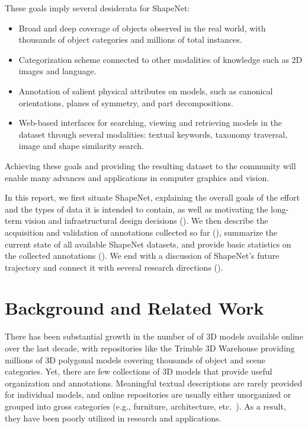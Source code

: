 These goals imply several desiderata for ShapeNet:
\begin{itemize}\denselist
 \item Broad and deep coverage of objects observed in the real world, with thousands of object categories and millions of total instances.
 \item Categorization scheme connected to other modalities of knowledge such as 2D images and language.
 \item Annotation of salient physical attributes on models, such as canonical orientations, planes of symmetry, and part decompositions.
 \item Web-based interfaces for searching, viewing and retrieving models in the dataset through several modalities: textual keywords, taxonomy traversal, image and shape similarity search.
\end{itemize}

Achieving these goals and providing the resulting dataset to the community will enable many advances and applications in computer graphics and vision.

In this report, we first situate ShapeNet, explaining the overall goals of the effort and the types of data it is intended to contain, as well as motivating the long-term vision and infrastructural design decisions ().  We then describe the acquisition and validation of annotations collected so far (), summarize the current state of all available ShapeNet datasets, and provide basic statistics on the collected annotations ().  We end with a discussion of ShapeNet's future trajectory and connect it with several research directions ().

\section{Background and Related Work}
There has been substantial growth in the number of of 3D models available online over the last decade, with repositories like the Trimble 3D Warehouse providing millions of 3D polygonal models covering thousands of object and scene categories.  Yet, there are few collections of 3D models that provide useful organization and annotations.  Meaningful textual descriptions are rarely provided for individual models, and online repositories are usually either unorganized or grouped into gross categories (e.g., furniture, architecture, etc.~\cite{GAMMA}).  As a result, they have been poorly utilized in research and applications.


